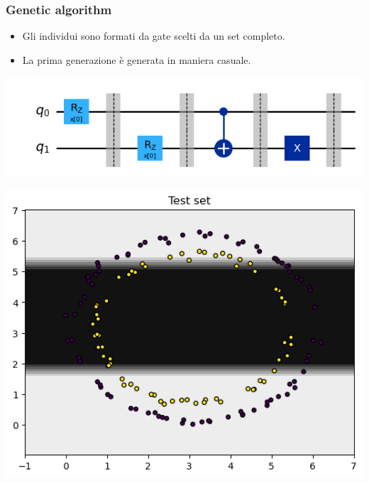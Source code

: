 \documentclass{beamer}
\begin{document}
\begin{frame}
  \frametitle{Genetic algorithm}
  \begin{itemize}
    \item Gli individui sono formati da gate scelti da un set completo.
    \item La prima generazione è generata in maniera casuale. 
  \end{itemize}
  \vspace{0.5cm}
  \begin{minipage}{0.5\textwidth}
    \centering
    \includegraphics[width=\textwidth]{images/fenotip.png}
\end{minipage}%
\begin{minipage}{0.5\textwidth}
    \centering
    \includegraphics[width=\textwidth]{images/badresult.png}
\end{minipage}
\end{frame}
\end{document}
